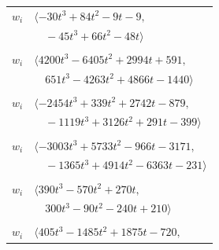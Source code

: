 \documentclass[11pt]{article}
\begin{document}
\begin{longtable}{@{}ll@{}}
$w_i$ & $\langle -30t^{3}+84t^{2}-9t-9,$\\
 & $\quad -45t^{3}+66t^{2}-48t\rangle$\\
\addlinespace[2pt]
\multicolumn{2}{@{}p{0.97\textwidth}@{}}{$i=34$, $D_i=16$, $\rho_{ij}$: $6{:}1, \allowbreak 11{:}2, \allowbreak 12{:}2, \allowbreak 16{:}2, \allowbreak 17{:}1, \allowbreak 18{:}2, \allowbreak 21{:}1, \allowbreak 35{:}2, \allowbreak 43{:}2, \allowbreak 46{:}2, \allowbreak 47{:}1, \allowbreak 48{:}2, \allowbreak 49{:}1, \allowbreak 54{:}1$}\\
$w_i$ & $\langle 4200t^{3}-6405t^{2}+2994t+591,$\\
 & $\quad 651t^{3}-4263t^{2}+4866t-1440\rangle$\\
\addlinespace[2pt]
\multicolumn{2}{@{}p{0.97\textwidth}@{}}{$i=35$, $D_i=16$, $\rho_{ij}$: $1{:}2, \allowbreak 10{:}2, \allowbreak 20{:}1, \allowbreak 24{:}1, \allowbreak 25{:}2, \allowbreak 28{:}1, \allowbreak 34{:}1, \allowbreak 44{:}2, \allowbreak 45{:}2, \allowbreak 49{:}1, \allowbreak 52{:}2, \allowbreak 53{:}2, \allowbreak 54{:}2$}\\
$w_i$ & $\langle -2454t^{3}+339t^{2}+2742t-879,$\\
 & $\quad -1119t^{3}+3126t^{2}+291t-399\rangle$\\
\addlinespace[2pt]
\multicolumn{2}{@{}p{0.97\textwidth}@{}}{$i=36$, $D_i=16$, $\rho_{ij}$: $1{:}1, \allowbreak 4{:}1, \allowbreak 5{:}2, \allowbreak 17{:}1, \allowbreak 19{:}1, \allowbreak 20{:}2, \allowbreak 23{:}1, \allowbreak 40{:}1, \allowbreak 46{:}2, \allowbreak 47{:}2, \allowbreak 52{:}1, \allowbreak 55{:}1$}\\
$w_i$ & $\langle -3003t^{3}+5733t^{2}-966t-3171,$\\
 & $\quad -1365t^{3}+4914t^{2}-6363t-231\rangle$\\
\addlinespace[2pt]
\multicolumn{2}{@{}p{0.97\textwidth}@{}}{$i=37$, $D_i=4$, $\rho_{ij}$: $5{:}1, \allowbreak 7{:}1, \allowbreak 27{:}1, \allowbreak 28{:}2, \allowbreak 51{:}1, \allowbreak 56{:}2, \allowbreak 58{:}2$}\\
$w_i$ & $\langle 390t^{3}-570t^{2}+270t,$\\
 & $\quad 300t^{3}-90t^{2}-240t+210\rangle$\\
\addlinespace[2pt]
\multicolumn{2}{@{}p{0.97\textwidth}@{}}{$i=38$, $D_i=4$, $\rho_{ij}$: $4{:}1, \allowbreak 16{:}1, \allowbreak 21{:}2, \allowbreak 24{:}1, \allowbreak 25{:}2, \allowbreak 28{:}2, \allowbreak 39{:}2, \allowbreak 56{:}1, \allowbreak 58{:}2$}\\
$w_i$ & $\langle 405t^{3}-1485t^{2}+1875t-720,$\\

\end{longtable}
\end{document}
